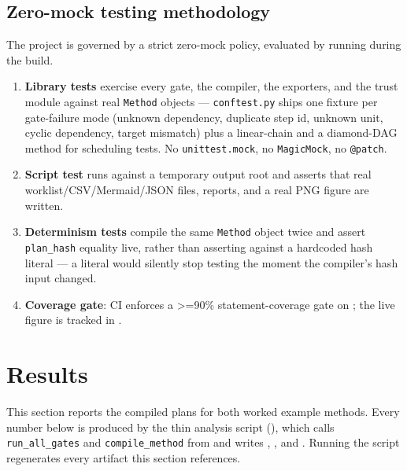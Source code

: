 \documentclass[
  english,
]{article}
\providecommand{\tightlist}{%
  \setlength{\itemsep}{0pt}\setlength{\parskip}{0pt}}
\begin{document}
\subsection{Zero-mock testing
methodology}\label{zero-mock-testing-methodology}

The project is governed by a strict zero-mock policy, evaluated by
running
during the build.

\begin{enumerate}
\def\labelenumi{\arabic{enumi}.}
\tightlist
\item
  \textbf{Library tests} exercise every gate, the compiler, the
  exporters, and the trust module against real \texttt{Method} objects
  --- \texttt{conftest.py} ships one fixture per gate-failure mode
  (unknown dependency, duplicate step id, unknown unit, cyclic
  dependency, target mismatch) plus a linear-chain and a diamond-DAG
  method for scheduling tests. No \texttt{unittest.mock}, no
  \texttt{MagicMock}, no \texttt{@patch}.
\item
  \textbf{Script test} runs  against a
  temporary output root and asserts that real worklist/CSV/Mermaid/JSON
  files, reports, and a real PNG figure are written.
\item
  \textbf{Determinism tests} compile the same \texttt{Method} object
  twice and assert \texttt{plan\_hash} equality live, rather than
  asserting against a hardcoded hash literal --- a literal would
  silently stop testing the moment the compiler's hash input changed.
\item
  \textbf{Coverage gate}: CI enforces a \texorpdfstring{\textgreater{}=}{>=}90\% statement-coverage gate on
  ; the live
  figure is tracked in
  \href{../../../../docs/_generated/COUNTS.md}{}.
\end{enumerate}

\newpage

\section{Results}\label{sec:results}

This section reports the compiled plans for both worked example methods.
Every number below is produced by the thin analysis script
(\href{https://github.com/docxology/template/blob/main/projects/templates/template_methods_paper/scripts/methods_analysis.py}{}),
which calls \texttt{run\_all\_gates} and \texttt{compile\_method} from
 and writes
,
, and
. Running the script
regenerates every artifact this section references.
\end{document}
